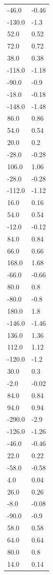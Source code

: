 \begin{longtable}{ll}
-46.0 & -0.46 \\
-130.0 & -1.3 \\
52.0 & 0.52 \\
72.0 & 0.72 \\
38.0 & 0.38 \\
-118.0 & -1.18 \\
-90.0 & -0.9 \\
-18.0 & -0.18 \\
-148.0 & -1.48 \\
86.0 & 0.86 \\
54.0 & 0.54 \\
20.0 & 0.2 \\
-28.0 & -0.28 \\
106.0 & 1.06 \\
-28.0 & -0.28 \\
-112.0 & -1.12 \\
16.0 & 0.16 \\
54.0 & 0.54 \\
-12.0 & -0.12 \\
84.0 & 0.84 \\
66.0 & 0.66 \\
168.0 & 1.68 \\
-66.0 & -0.66 \\
80.0 & 0.8 \\
-80.0 & -0.8 \\
180.0 & 1.8 \\
-146.0 & -1.46 \\
136.0 & 1.36 \\
112.0 & 1.12 \\
-120.0 & -1.2 \\
30.0 & 0.3 \\
-2.0 & -0.02 \\
84.0 & 0.84 \\
94.0 & 0.94 \\
-290.0 & -2.9 \\
-126.0 & -1.26 \\
-46.0 & -0.46 \\
22.0 & 0.22 \\
-58.0 & -0.58 \\
4.0 & 0.04 \\
26.0 & 0.26 \\
-8.0 & -0.08 \\
-90.0 & -0.9 \\
58.0 & 0.58 \\
64.0 & 0.64 \\
80.0 & 0.8 \\
14.0 & 0.14 \\

\end{longtable}
